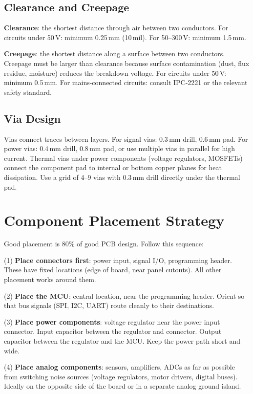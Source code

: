 \subsection{Clearance and Creepage}
\textbf{Clearance}: the shortest distance through air between two conductors. For circuits under 50\,V: minimum 0.25\,mm (10\,mil). For 50--300\,V: minimum 1.5\,mm.

\textbf{Creepage}: the shortest distance along a surface between two conductors. Creepage must be larger than clearance because surface contamination (dust, flux residue, moisture) reduces the breakdown voltage. For circuits under 50\,V: minimum 0.5\,mm. For mains-connected circuits: consult IPC-2221 or the relevant safety standard.

\subsection{Via Design}
Vias connect traces between layers. For signal vias: 0.3\,mm drill, 0.6\,mm pad. For power vias: 0.4\,mm drill, 0.8\,mm pad, or use multiple vias in parallel for high current. Thermal vias under power components (voltage regulators, MOSFETs) connect the component pad to internal or bottom copper planes for heat dissipation. Use a grid of 4--9 vias with 0.3\,mm drill directly under the thermal pad.

\section{Component Placement Strategy}
Good placement is 80\% of good PCB design. Follow this sequence:

(1) \textbf{Place connectors first}: power input, signal I/O, programming header. These have fixed locations (edge of board, near panel cutouts). All other placement works around them.

(2) \textbf{Place the MCU}: central location, near the programming header. Orient so that bus signals (SPI, I2C, UART) route cleanly to their destinations.

(3) \textbf{Place power components}: voltage regulator near the power input connector. Input capacitor between the regulator and connector. Output capacitor between the regulator and the MCU. Keep the power path short and wide.

(4) \textbf{Place analog components}: sensors, amplifiers, ADCs as far as possible from switching noise sources (voltage regulators, motor drivers, digital buses). Ideally on the opposite side of the board or in a separate analog ground island.

